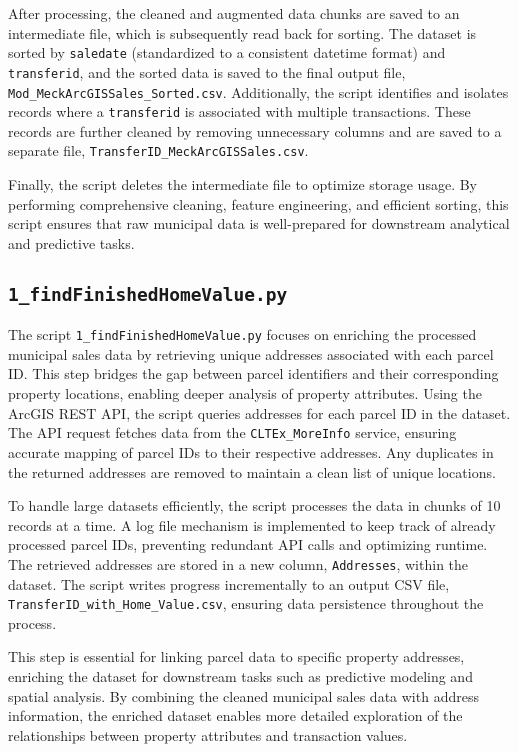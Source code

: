 After processing, the cleaned and augmented data chunks are saved to an intermediate file, which is subsequently read back for sorting. The dataset is sorted by \texttt{saledate} (standardized to a consistent datetime format) and \texttt{transferid}, and the sorted data is saved to the final output file, \texttt{Mod\_MeckArcGISSales\_Sorted.csv}. Additionally, the script identifies and isolates records where a \texttt{transferid} is associated with multiple transactions. These records are further cleaned by removing unnecessary columns and are saved to a separate file, \texttt{TransferID\_MeckArcGISSales.csv}.

Finally, the script deletes the intermediate file to optimize storage usage. By performing comprehensive cleaning, feature engineering, and efficient sorting, this script ensures that raw municipal data is well-prepared for downstream analytical and predictive tasks.

\subsection{\texttt{1\_findFinishedHomeValue.py}}

The script \texttt{1\_findFinishedHomeValue.py} focuses on enriching the processed municipal sales data by retrieving unique addresses associated with each parcel ID. This step bridges the gap between parcel identifiers and their corresponding property locations, enabling deeper analysis of property attributes. Using the ArcGIS REST API, the script queries addresses for each parcel ID in the dataset. The API request fetches data from the \texttt{CLTEx\_MoreInfo} service, ensuring accurate mapping of parcel IDs to their respective addresses. Any duplicates in the returned addresses are removed to maintain a clean list of unique locations.

To handle large datasets efficiently, the script processes the data in chunks of 10 records at a time. A log file mechanism is implemented to keep track of already processed parcel IDs, preventing redundant API calls and optimizing runtime. The retrieved addresses are stored in a new column, \texttt{Addresses}, within the dataset. The script writes progress incrementally to an output CSV file, \texttt{TransferID\_with\_Home\_Value.csv}, ensuring data persistence throughout the process.

This step is essential for linking parcel data to specific property addresses, enriching the dataset for downstream tasks such as predictive modeling and spatial analysis. By combining the cleaned municipal sales data with address information, the enriched dataset enables more detailed exploration of the relationships between property attributes and transaction values.

